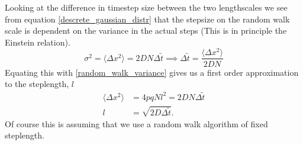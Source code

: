 Looking at the difference in timestep size between the two lengthscales we see from equation \ref{descrete_gaussian_distr} that the stepsize on the random walk scale is dependent on the variance in the actual steps (This is in principle the Einstein relation). 
\begin{equation}
 \sigma^2 = \langle\Delta x^2\rangle = 2DN\Delta\tilde{t} \implies \Delta\tilde{t} = \frac{\langle\Delta x^2\rangle}{2DN}
\end{equation}
Equating this with \ref{random_walk_variance} gives us a first order approximation to the steplength, $l$
\begin{align}
 \langle\Delta x^2\rangle &= 4pqNl^2 = 2DN\Delta\tilde{t} \nonumber \\ 
 l &= \sqrt{2D\Delta\tilde{t}}. \label{steplength}
\end{align}
Of course this is assuming that we use a random walk algorithm of fixed steplength.